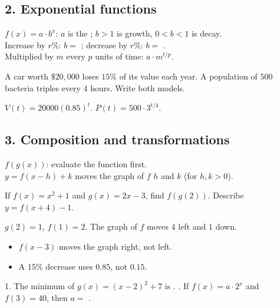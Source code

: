 \subsection*{2. Exponential functions}
\begin{keyidea}
$f(x)=a\cdot b^{x}$: $a$ is the ; $b>1$ is growth, $0<b<1$ is decay.\\
Increase by $r\%$: $b=$ ; decrease by $r\%$: $b=$ .\\
Multiplied by $m$ every $p$ units of time: $a\cdot m^{t/p}$.
\end{keyidea}

A car worth $\$20{,}000$ loses $15\%$ of its value each year. A population of $500$ bacteria triples every $4$ hours. Write both models.
\begin{workspace}[2cm]
$V(t)=20000(0.85)^t$. \quad $P(t)=500\cdot3^{t/4}$.
\end{workspace}

\subsection*{3. Composition and transformations}
\begin{keyidea}
$f(g(x))$: evaluate the  function first.\\
$y=f(x-h)+k$ moves the graph of $f$  $h$ and  $k$ (for $h,k>0$).
\end{keyidea}

If $f(x)=x^2+1$ and $g(x)=2x-3$, find $f(g(2))$. Describe $y=f(x+4)-1$.
\begin{workspace}[1.8cm]
$g(2)=1$, $f(1)=2$. \quad The graph of $f$ moves $4$ left and $1$ down.
\end{workspace}

\begin{mistakes}
\begin{itemize}
\item $f(x-3)$ moves the graph right, not left.
\item A $15\%$ decrease uses $0.85$, not $0.15$.
\end{itemize}
\end{mistakes}

\begin{quickcheck}
1. The minimum of $g(x)=(x-2)^2+7$ is . . If $f(x)=a\cdot2^x$ and $f(3)=40$, then $a=$ .
\end{quickcheck}
